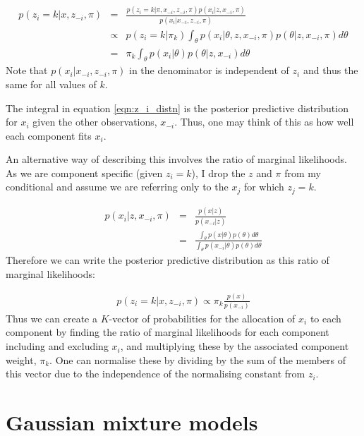 \documentclass[12pt]{article} %
\begin{document}
	\begin{eqnarray}
		p(z_i = k | x, z_{-i}, \pi) &=& \frac{p(z_i = k | \pi, x_{-i}, z_{-i}, \pi) p(x_i | z, x_{-i}, \pi)}{p(x_i | x_{-i}, z_{-i}, \pi)} \label{eqn:placeholder} \\
		&\propto& p(z_i = k | \pi_k) \int_{\theta} p(x_i | \theta,  z, x_{-i}, \pi) p(\theta | z, x_{-i}, \pi) d \theta \\
		&=& \pi_k \int_{\theta} p(x_i | \theta) p(\theta | z, x_{-i}) d \theta \label{eqn:z_i_distn}
	\end{eqnarray}
	Note that $p(x_i | x_{-i}, z_{-i}, \pi)$ in the denominator is independent of $z_i$ and thus the same for all values of $k$.
	
	The integral in equation \ref{eqn:z_i_distn} is the posterior predictive distribution for $x_i$ given the other observations, $x_{-i}$. Thus, one may think of this as how well each component fits $x_i$.
	
    An alternative way of describing this involves the ratio of marginal likelihoods. As we are component specific (given $z_i = k$), I drop the $z$ and $\pi$ from my conditional and assume we are referring only to the $x_j$ for which $z_j = k$.
    
    \begin{eqnarray}
    p(x_i | z, x_{-i}, \pi) &=& \frac{p(x | z)}{p(x_{-i} | z)} \\
      &=& \frac{\int_\theta p(x | \theta) p(\theta) d\theta}{\int_\theta p(x_{-i} | \theta) p(\theta) d\theta}
    \end{eqnarray}
    Therefore we can write the posterior predictive distribution as this ratio of marginal likelihoods:
    
    \begin{eqnarray}
    p(z_i = k | x, z_{-i}, \pi) \propto \pi_k \frac{p(x)}{p(x_{-i})}
    \end{eqnarray}
    Thus we can create a $K$-vector of probabilities for the allocation of $x_i$ to each component by finding the ratio of marginal likelihoods for each component including and excluding $x_i$, and multiplying these by the associated component weight, $\pi_k$. One can normalise these by dividing by the sum of the members of this vector due to the independence of the normalising constant from $z_i$.
	
	\section{Gaussian mixture models}
	
\end{document}
